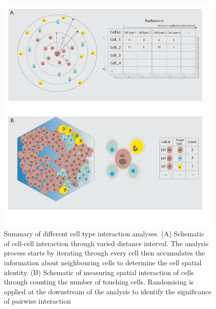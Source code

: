 \begin{figure}
    \centering
    \includegraphics[width=0.85\columnwidth]{Chapter3/Figures/Conceptualise_CCC_analysis_cropped-01.png}
    \caption{Summary of different cell type interaction analyses. (A) Schematic of cell-cell interaction through varied distance interval. The analysis process starts by iterating through every cell then accumulates the information about neighbouring cells to determine the cell spatial identity. (B) Schematic of measuring spatial interaction of cells through counting the number of touching cells. Randomising is applied at the downstream of the analysis to identify the significance of pairwise interaction}
    \label{fig:CCC_conceptualised}
\end{figure}

